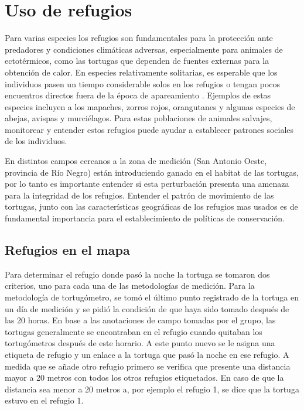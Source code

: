 \chapter{Uso de refugios}
Para varias especies los refugios son fundamentales para la protección ante predadores y  condiciones climáticas adversas, especialmente para animales de ectotérmicos, como las tortugas que dependen de fuentes externas para la obtención de calor. En especies relativamente solitarias, es esperable que los individuos pasen un tiempo considerable solos en los refugios o tengan pocos encuentros directos fuera de la época de apareamiento \cite{bipartitasTortusPaper}. Ejemplos de estas especies incluyen a los mapaches, zorros rojos, orangutanes y algunas especies de abejas, avispas y murciélagos. Para estas poblaciones de animales salvajes, monitorear y entender estos refugios puede ayudar a establecer patrones sociales de los individuos.
 
En distintos campos cercanos a la zona de medición (San Antonio Oeste, provincia de Río Negro) están introduciendo ganado en el habitat de las tortugas, por lo tanto es importante entender si esta perturbación presenta una amenaza para la integridad de los refugios. Entender el patrón de movimiento  de las tortugas, junto con las características geográficas de los refugios mas usados es de fundamental importancia para el establecimiento de políticas de conservación.
 
\section{Refugios en el mapa}
Para determinar el refugio donde pasó la noche la tortuga se tomaron dos criterios, uno para cada una de las metodologías de medición. Para la metodología de tortugómetro, se tomó el último punto registrado de la tortuga en un día de medición y se pidió la condición de que haya sido tomado después de las 20 horas. En base a las anotaciones de campo tomadas por el grupo, las tortugas generalmente  se encontraban en el refugio cuando quitaban los tortugómetros después de este horario. A este punto nuevo se le asigna una etiqueta de refugio y un enlace a la tortuga que pasó la noche en ese refugio. A medida que se añade otro refugio primero se verifica que presente una distancia mayor a 20 metros con todos los otros refugios etiquetados. En caso de que la distancia sea menor a 20 metros a, por ejemplo el refugio 1, se dice que la tortuga estuvo en el refugio 1.
                  
